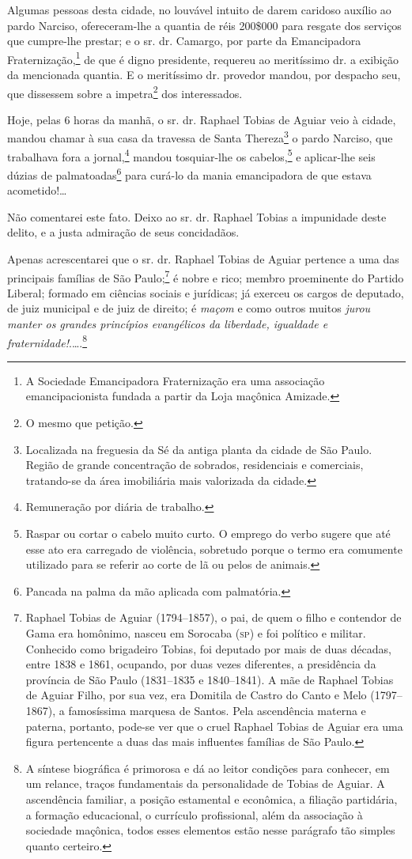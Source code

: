 {Algumas pessoas desta cidade, no louvável intuito de darem caridoso
auxílio ao pardo Narciso, ofereceram-lhe a quantia de réis 200\$000 para
resgate dos serviços que cumpre-lhe prestar; e o sr. dr. Camargo, por
parte da Emancipadora Fraternização,\footnote{A
  Sociedade Emancipadora Fraternização era uma associação
  emancipacionista fundada a partir da Loja maçônica Amizade.} de que é
digno presidente, requereu ao meritíssimo dr. a exibição da mencionada
quantia. E o meritíssimo dr. provedor mandou, por despacho seu, que
dissessem sobre a impetra\footnote{ O mesmo que petição.} dos
interessados.

Hoje, pelas 6 horas da manhã, o sr. dr. Raphael Tobias de Aguiar veio à
cidade, mandou chamar à sua casa da travessa de Santa Thereza\footnote{
  Localizada na freguesia da Sé da antiga planta da cidade de São Paulo.
  Região de grande concentração de sobrados, residenciais e comerciais,
  tratando-se da área imobiliária mais valorizada da cidade.} o pardo
Narciso, que trabalhava fora a jornal,\footnote{
  Remuneração por diária de trabalho.} mandou tosquiar-lhe os
cabelos,\footnote{ Raspar ou cortar o cabelo muito curto. O emprego
  do verbo sugere que até esse ato era carregado de violência, sobretudo
  porque o termo era comumente utilizado para se referir ao corte de lã
  ou pelos de animais.} e aplicar-lhe seis dúzias de
palmatoadas\footnote{ Pancada na palma da mão aplicada com
  palmatória.} para curá-lo da mania emancipadora de que estava
acometido!\ldots{}

Não comentarei este fato. Deixo ao sr. dr. Raphael Tobias a impunidade
deste delito, e a justa admiração de seus concidadãos.

Apenas acrescentarei que o sr. dr. Raphael Tobias de Aguiar pertence a
uma das principais famílias de São Paulo;\footnote{ Raphael Tobias de
  Aguiar (1794--1857), o pai, de quem o filho e contendor de Gama era
  homônimo, nasceu em Sorocaba (\textsc{sp}) e foi político e militar. Conhecido
  como brigadeiro Tobias, foi deputado por mais de duas décadas, entre
  1838 e 1861, ocupando, por duas vezes diferentes, a presidência da
  província de São Paulo (1831--1835 e 1840--1841). A mãe de Raphael
  Tobias de Aguiar Filho, por sua vez, era Domitila de Castro do Canto e
  Melo (1797--1867), a famosíssima marquesa de Santos. Pela ascendência
  materna e paterna, portanto, pode-se ver que o cruel Raphael Tobias de
  Aguiar era uma figura pertencente a duas das mais influentes famílias
  de São Paulo.} é nobre e rico; membro proeminente do Partido Liberal;
formado em ciências sociais e jurídicas; já exerceu os cargos de
deputado, de juiz municipal e de juiz de direito; é \emph{maçom} e como
outros muitos \emph{jurou manter os grandes princípios evangélicos da
liberdade, igualdade e fraternidade!}.\ldots.\footnote{ A síntese
  biográfica é primorosa e dá ao leitor condições para conhecer, em um
  relance, traços fundamentais da personalidade de Tobias de Aguiar. A
  ascendência familiar, a posição estamental e econômica, a filiação
  partidária, a formação educacional, o currículo profissional, além da
  associação à sociedade maçônica, todos esses elementos estão nesse
  parágrafo tão simples quanto certeiro.}

}
